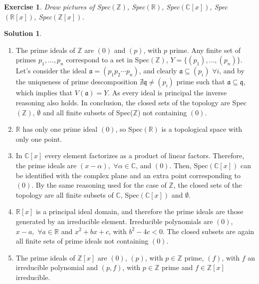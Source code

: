 \documentclass[12pt]{article}
\newcommand{\Z}{\ensuremath{\mathbb{Z}}}
\newcommand{\R}{\ensuremath{\mathbb{R}}}
\newcommand{\C}{\ensuremath{\mathbb{C}}}
\newcommand{\ia}{\ensuremath{\mathfrak{a}}}
\newtheorem{ex}{Exercise}[section]
\theoremstyle{definition}
\newtheorem*{sol}{Solution}
\begin{document}
\begin{ex}
	Draw pictures of Spec$(\Z)$, Spec$(\R)$, Spec$(\C[x])$, Spec$(\R[x])$, Spec$(\Z[x])$.
\end{ex}

\begin{sol}
	\begin{enumerate}[label=(\roman*)]
		\item The prime ideals of $\Z$ are $(0)$ and $(p)$, with $p$ prime. Any finite set of primes $p_1, \dots, p_n$ correspond to a set in Spec$(\Z)$, $Y = \{(p_1), \dots, (p_n)\}$. Let's consider the ideal $\ia = (p_1p_2 \cdots p_n)$, and clearly $\ia \subseteq (p_i) \, \, \forall i$, and by the uniqueness of prime descomposition $\nexists \mathfrak{q} \neq (p_i)$ prime such that $\ia \subseteq \mathfrak{q}$, which implies that $V(\ia) = Y$. As every ideal is principal the inverse reasoning also holds. In conclusion, the closed sets of the topology are Spec$(\Z)$, $\emptyset$ and all finite subsets of Spec($\Z$) not containing $(0)$.

		\item $\R$ has only one prime ideal $(0)$, so Spec$(\R)$ is a topological space with only one point.

		\item In $\C[x]$ every element factorizes as a product of linear factors. Therefore, the prime ideals are $(x-\alpha), \, \, \forall \alpha \in \C$, and $(0)$. Then, Spec$(\C[x])$ can be identified with the complex plane and an extra point corresponding to $(0)$. By the same reasoning used for the case of $\Z$, the closed sets of the topology are all finite subsets of $\C$, Spec$(\C[x])$ and $\emptyset$.

		\item $\R[x]$ is a principal ideal domain, and therefore the prime ideals are those generated by an irreducible element. Irreducible polynomials are $(0)$, $x-a, \, \, \forall a \in \R$ and $x^2 +bx +c$, with $b^2-4c < 0$. The closed subsets are again all finite sets of prime ideals not containing $(0)$.

		\item The prime ideals of $\Z[x]$ are $(0)$, $(p)$, with $p \in \Z$ prime, $(f)$, with $f$ an irreducible polynomial and $(p,f)$, with $p \in \Z$ prime and $f \in \Z[x]$ irreducible.
	\end{enumerate}
\end{sol}
\end{document}

